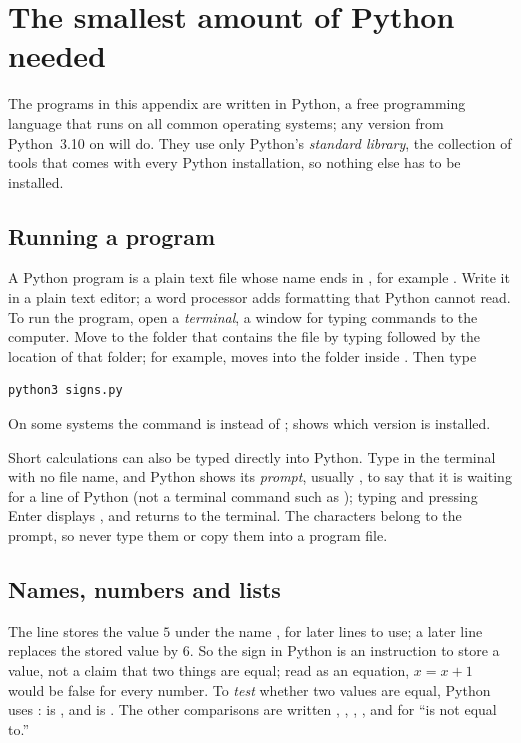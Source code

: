 \section{The smallest amount of Python needed}\label{appD:sec:python}
The programs in this appendix are written in Python, a free programming language that runs on all common operating systems; any version from Python~3.10 on will do. They use only Python's \emph{standard library}, the collection of tools that comes with every Python installation, so nothing else has to be installed.

\subsection*{Running a program}
A Python program is a plain text file whose name ends in , for example . Write it in a plain text editor; a word processor adds formatting that Python cannot read. To run the program, open a \emph{terminal}, a window for typing commands to the computer. Move to the folder that contains the file by typing  followed by the location of that folder; for example,  moves into the folder  inside . Then type
\par\noindent\begin{minipage}{\linewidth}
\begin{lstlisting}
python3 signs.py
\end{lstlisting}
\end{minipage}\par
On some systems the command is  instead of ;  shows which version is installed.

Short calculations can also be typed directly into Python. Type  in the terminal with no file name, and Python shows its \emph{prompt}, usually \code{>{}>{}>}, to say that it is waiting for a line of Python (not a terminal command such as ); typing  and pressing Enter displays , and  returns to the terminal. The characters \code{>{}>{}>} belong to the prompt, so never type them or copy them into a program file.

\subsection*{Names, numbers and lists}
The line  stores the value $5$ under the name , for later lines to use; a later line  replaces the stored value by $6$. So the sign \code{=} in Python is an instruction to store a value, not a claim that two things are equal; read as an equation, $x=x+1$ would be false for every number. To \emph{test} whether two values are equal, Python uses \code{==}:  is , and  is . The other comparisons are written \code{<}, \code{<=}, \code{>}, \code{>=}, and \code{!=} for ``is not equal to.''

